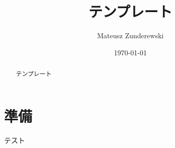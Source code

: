 \documentclass{jsarticle}
\title{テンプレート}
\author{Mateusz Zunderewski}
\date{\today}
\begin{document}
\maketitle

\begin{abstract}
	テンプレート
\end{abstract}

\setcounter{tocdepth}{3}
\tableofcontents

\pagebreak

\section{準備}

\begin{definition}
	テスト
\end{definition}


\end{document}
